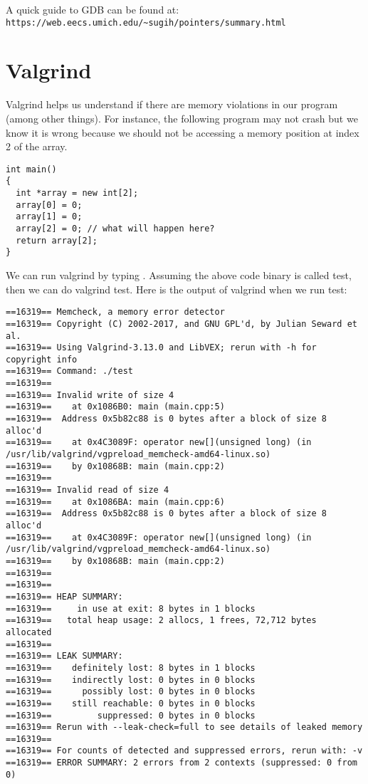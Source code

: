 \documentclass[12pt]{article}
\begin{document}
A quick guide to GDB can be found at:\\
\texttt{https://web.eecs.umich.edu/\textasciitilde{}sugih/pointers/summary.html}

\section*{Valgrind}

Valgrind helps us understand if there are memory violations in our program
(among other things). For instance, the following program may not crash but we
know it is wrong because we should not be accessing a memory position at index 2
of the array.

\begin{lstlisting}
int main()
{
  int *array = new int[2];
  array[0] = 0;
  array[1] = 0;
  array[2] = 0; // what will happen here?
  return array[2];
}
\end{lstlisting}

We can run valgrind by typing . Assuming the
above code binary is called test, then we can do valgrind test. Here is the
output of valgrind when we run test:

\begin{verbatim}
==16319== Memcheck, a memory error detector
==16319== Copyright (C) 2002-2017, and GNU GPL'd, by Julian Seward et al.
==16319== Using Valgrind-3.13.0 and LibVEX; rerun with -h for copyright info
==16319== Command: ./test
==16319== 
==16319== Invalid write of size 4
==16319==    at 0x1086B0: main (main.cpp:5)
==16319==  Address 0x5b82c88 is 0 bytes after a block of size 8 alloc'd
==16319==    at 0x4C3089F: operator new[](unsigned long) (in
/usr/lib/valgrind/vgpreload_memcheck-amd64-linux.so)
==16319==    by 0x10868B: main (main.cpp:2)
==16319== 
==16319== Invalid read of size 4
==16319==    at 0x1086BA: main (main.cpp:6)
==16319==  Address 0x5b82c88 is 0 bytes after a block of size 8 alloc'd
==16319==    at 0x4C3089F: operator new[](unsigned long) (in
/usr/lib/valgrind/vgpreload_memcheck-amd64-linux.so)
==16319==    by 0x10868B: main (main.cpp:2)
==16319== 
==16319== 
==16319== HEAP SUMMARY:
==16319==     in use at exit: 8 bytes in 1 blocks
==16319==   total heap usage: 2 allocs, 1 frees, 72,712 bytes allocated
==16319== 
==16319== LEAK SUMMARY:
==16319==    definitely lost: 8 bytes in 1 blocks
==16319==    indirectly lost: 0 bytes in 0 blocks
==16319==      possibly lost: 0 bytes in 0 blocks
==16319==    still reachable: 0 bytes in 0 blocks
==16319==         suppressed: 0 bytes in 0 blocks
==16319== Rerun with --leak-check=full to see details of leaked memory
==16319== 
==16319== For counts of detected and suppressed errors, rerun with: -v
==16319== ERROR SUMMARY: 2 errors from 2 contexts (suppressed: 0 from 0)
\end{verbatim}
\end{document}

